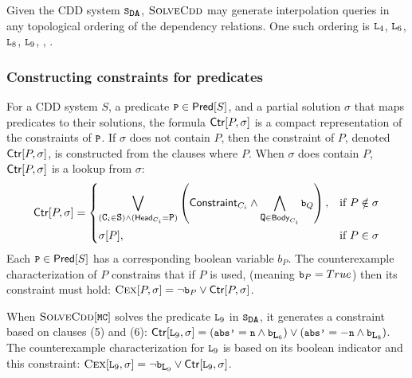 %
\begin{ex}
  Given the CDD system $\mcchc$, $\textsc{SolveCdd}$ may generate interpolation
  queries in any topological ordering of the dependency relations.
  One such ordering is $\cc{L}_4$, $\cc{L}_6$, $\cc{L}_8$, $\cc{L}_9$, ,
  .
\end{ex}

\subsubsection{Constructing constraints for predicates}
%
For a CDD system $S$, a predicate $\cc{P} \in \predof{S}$, and a partial
solution $\sigma$ that maps predicates to their solutions, the formula
$\mathsf{Ctr}[P,\sigma]$ is a compact representation of the constraints of $\cc{P}$.
%
If $\sigma$ does not contain $P$, then the constraint of $P$, denoted
$\mathsf{Ctr}[P,\sigma]$, is constructed from the clauses where $P$.  When $\sigma$
does contain $P$, $\mathsf{Ctr}[P,\sigma]$ is a lookup from $\sigma$:
%
\[
  \ctrof{P,\sigma}=
  \begin{dcases}
    \biglor_{(\cc{C}_i \in \cc{S}) \land (\headof{C_i} = \cc{P})}
    \left( \consof{C_i} \land %
      \bigland_{ \cc{Q} \in \bodyof{C_i}} \cc{b}_Q
    \right),
  &\text{if } P \notin \sigma\\
  \sigma[P], &\text{if } P \in \sigma
  \end{dcases}
\]
%
Each $\cc{P} \in \predof{S}$ has a corresponding boolean variable $b_P$.
%
The counterexample characterization of $P$ constrains that if $P$ is used,
(meaning $\cc{b}_{P} = True$) then its constraint must hold:
%
$\vc{P,\sigma} = \neg \cc{b}_{P} \lor \ctrof{P,\sigma}$.


\begin{ex}
  \label{ex:ctr}
  When $\mcsolve$ solves the predicate $\cc{L}_9$ in $\mcchc$, it generates a
  constraint based on clauses (5) and (6):
  $\ctrof{\cc{L}_9,\sigma} =
    (\cc{abs'} = \cc{n} \land \cc{b}_{\cc{L}_6})
    \lor
    (\cc{abs'} = -\cc{n} \land \cc{b}_{\cc{L}_8})$.
  The counterexample characterization for $\cc{L}_9$ is based on its boolean
  indicator and this constraint:
  $\vc{\cc{L}_9,\sigma} = \neg \cc{b}_{\cc{L}_9} \lor \ctrof{\cc{L}_9,\sigma}$.
\end{ex}

